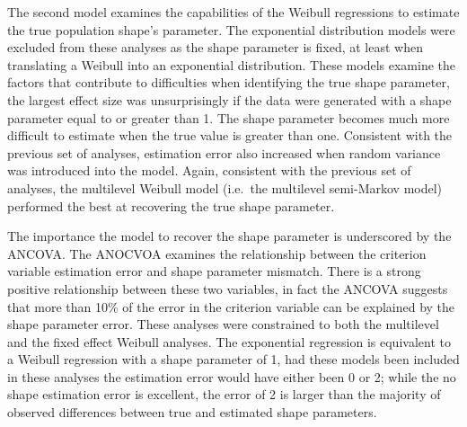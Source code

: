 \documentclass[12pt]{./styles/outhesis}
\begin{document}
The second model examines the capabilities of the Weibull regressions to
estimate the true population shape's parameter. The exponential
distribution models were excluded from these analyses as the shape
parameter is fixed, at least when translating a Weibull into an
exponential distribution. These models examine the factors that
contribute to difficulties when identifying the true shape parameter,
the largest effect size was unsurprisingly if the data were generated
with a shape parameter equal to or greater than 1. The shape parameter
becomes much more difficult to estimate when the true value is greater
than one. Consistent with the previous set of analyses, estimation error
also increased when random variance was introduced into the model.
Again, consistent with the previous set of analyses, the multilevel
Weibull model (i.e.~the multilevel semi-Markov model) performed the best
at recovering the true shape parameter.

The importance the model to recover the shape parameter is underscored
by the ANCOVA. The ANOCVOA examines the relationship between the
criterion variable estimation error and shape parameter mismatch. There
is a strong positive relationship between these two variables, in fact
the ANCOVA suggests that more than 10\% of the error in the criterion
variable can be explained by the shape parameter error. These analyses
were constrained to both the multilevel and the fixed effect Weibull
analyses. The exponential regression is equivalent to a Weibull
regression with a shape parameter of 1, had these models been included
in these analyses the estimation error would have either been 0 or 2;
while the no shape estimation error is excellent, the error of 2 is
larger than the majority of observed differences between true and
estimated shape parameters.
\end{document}
